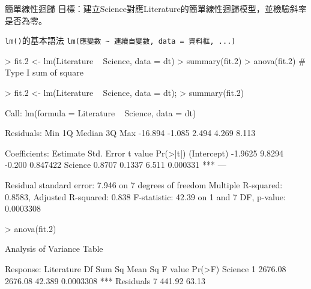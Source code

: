 \documentclass[14pt, aspectratio=43]{beamer}
\begin{document}
%


\begin{frame}{簡單線性迴歸}
目標：建立Science對應Literature的簡單線性迴歸模型，並檢驗斜率是否為零。
\begin{block}{\texttt{lm()}的基本語法}
\verb+lm(應變數 ~ 連續自變數, data = 資料框, ...)+
\end{block}
\begin{RC}
> fit.2 <- lm(Literature ~ Science, data = dt)
> summary(fit.2)
> anova(fit.2) # Type I sum of square
\end{RC}

\framebreak

\begin{RC}
> fit.2 <- lm(Literature ~ Science, data = dt); 
> summary(fit.2)
\end{RC}
\begin{R}
Call:
lm(formula = Literature ~ Science, data = dt)

Residuals:
    Min      1Q  Median      3Q     Max 
-16.894  -1.085   2.494   4.269   8.113 

Coefficients:
            Estimate Std. Error t value Pr(>|t|)    
(Intercept)  -1.9625     9.8294  -0.200 0.847422    
Science       0.8707     0.1337   6.511 0.000331 ***
---

Residual standard error: 7.946 on 7 degrees of freedom
Multiple R-squared:  0.8583, Adjusted R-squared:  0.838 
F-statistic: 42.39 on 1 and 7 DF,  p-value: 0.0003308
\end{R}

\framebreak

\begin{RC}
> anova(fit.2)
\end{RC}
\begin{R}
Analysis of Variance Table

Response: Literature
          Df  Sum Sq Mean Sq F value    Pr(>F)    
Science    1 2676.08 2676.08  42.389 0.0003308 ***
Residuals  7  441.92   63.13                      
\end{R}
\end{frame}
\end{document}
